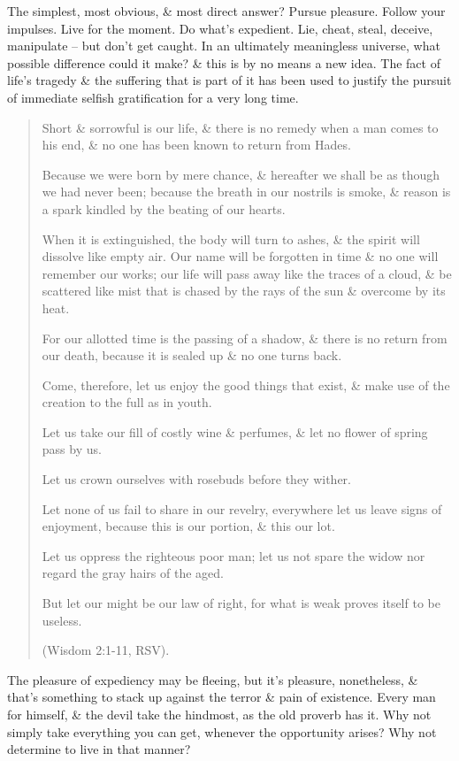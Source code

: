 \documentclass{article}
\begin{document}
The simplest, most obvious, \& most direct answer? Pursue pleasure. Follow your impulses. Live for the moment. Do what's expedient. Lie, cheat, steal, deceive, manipulate -- but don't get caught. In an ultimately meaningless universe, what possible difference could it make? \& this is by no means a new idea. The fact of life's tragedy \& the suffering that is part of it has been used to justify the pursuit of immediate selfish gratification for a very long time.
\begin{quotation}
	Short \& sorrowful is our life, \& there is no remedy when a man comes to his end, \& no one has been known to return from Hades.
	
	Because we were born by mere chance, \& hereafter we shall be as though we had never been; because the breath in our nostrils is smoke, \& reason is a spark kindled by the beating of our hearts.
	
	When it is extinguished, the body will turn to ashes, \& the spirit will dissolve like empty air. Our name will be forgotten in time \& no one will remember our works; our life will pass away like the traces of a cloud, \& be scattered like mist that is chased by the rays of the sun \& overcome by its heat.
	
	For our allotted time is the passing of a shadow, \& there is no return from our death, because it is sealed up \& no one turns back.
	
	Come, therefore, let us enjoy the good things that exist, \& make use of the creation to the full as in youth.
	
	Let us take our fill of costly wine \& perfumes, \& let no flower of spring pass by us.
	
	Let us crown ourselves with rosebuds before they wither.
	
	Let none of us fail to share in our revelry, everywhere let us leave signs of enjoyment, because this is our portion, \& this our lot.
	
	Let us oppress the righteous poor man; let us not spare the widow nor regard the gray hairs of the aged.
	
	But let our might be our law of right, for what is weak proves itself to be useless.
	
	(Wisdom 2:1-11, RSV).
\end{quotation}
The pleasure of expediency may be fleeing, but it's pleasure, nonetheless, \& that's something to stack up against the terror \& pain of existence. Every man for himself, \& the devil take the hindmost, as the old proverb has it. Why not simply take everything you can get, whenever the opportunity arises? Why not determine to live in that manner?
\end{document}
